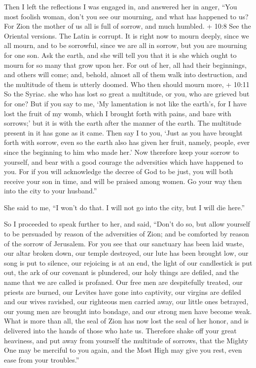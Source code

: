  Then I left the reflections I was engaged in, and answered
her in anger,  ``You most foolish woman, don't you see our
mourning, and what has happened to us?  For Zion the mother
of us all is full of sorrow, and much humbled.  + 10:8 See
the Oriental versions. The Latin is corrupt. It is right now to mourn
deeply, since we all mourn, and to be sorrowful, since we are all in
sorrow, but you are mourning for one son.  Ask the earth,
and she will tell you that it is she which ought to mourn for so many
that grow upon her.  For out of her, all had their
beginnings, and others will come; and, behold, almost all of them walk
into destruction, and the multitude of them is utterly doomed.
 Who then should mourn more, + 10:11 So the Syriac. she who
has lost so great a multitude, or you, who are grieved but for one?
 But if you say to me, `My lamentation is not like the
earth's, for I have lost the fruit of my womb, which I brought forth
with pains, and bare with sorrows;'  but it is with the
earth after the manner of the earth. The multitude present in it has
gone as it came.  Then say I to you, `Just as you have
brought forth with sorrow, even so the earth also has given her fruit,
namely, people, ever since the beginning to him who made her.'
 Now therefore keep your sorrow to yourself, and bear with
a good courage the adversities which have happened to you. 
For if you will acknowledge the decree of God to be just, you will both
receive your son in time, and will be praised among women. 
Go your way then into the city to your husband.''

 She said to me, ``I won't do that. I will not go into the
city, but I will die here.''

 So I proceeded to speak further to her, and said,
 ``Don't do so, but allow yourself to be persuaded by
reason of the adversities of Zion; and be comforted by reason of the
sorrow of Jerusalem.  For you see that our sanctuary has
been laid waste, our altar broken down, our temple destroyed,
 our lute has been brought low, our song is put to silence,
our rejoicing is at an end, the light of our candlestick is put out, the
ark of our covenant is plundered, our holy things are defiled, and the
name that we are called is profaned. Our free men are despitefully
treated, our priests are burned, our Levites have gone into captivity,
our virgins are defiled and our wives ravished, our righteous men
carried away, our little ones betrayed, our young men are brought into
bondage, and our strong men have become weak.  What is more
than all, the seal of Zion has now lost the seal of her honor, and is
delivered into the hands of those who hate us.  Therefore
shake off your great heaviness, and put away from yourself the multitude
of sorrows, that the Mighty One may be merciful to you again, and the
Most High may give you rest, even ease from your troubles.''

